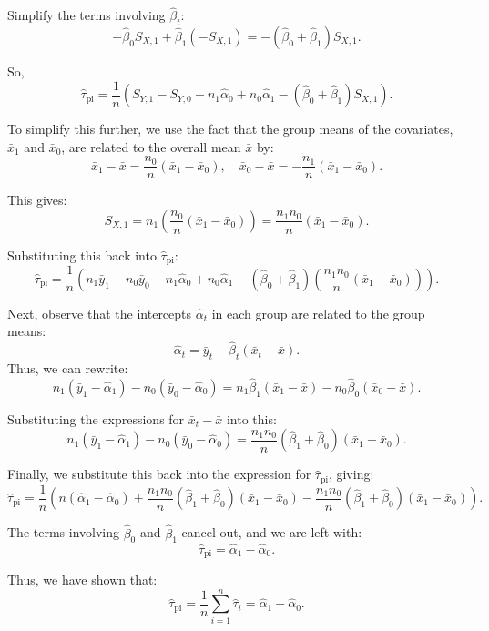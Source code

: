 \documentclass{article}
\begin{document}
Simplify the terms involving \(\hat{\beta}_t\):
\[
- \hat{\beta}_0 S_{X,1} + \hat{\beta}_1 (- S_{X,1}) = - (\hat{\beta}_0 + \hat{\beta}_1) S_{X,1}.
\]

So,
\[
\hat{\tau}_{\text{pi}} = \frac{1}{n} \left( S_{Y,1} - S_{Y,0} - n_1 \hat{\alpha}_0 + n_0 \hat{\alpha}_1 - (\hat{\beta}_0 + \hat{\beta}_1) S_{X,1} \right).
\]

To simplify this further, we use the fact that the group means of the covariates, \(\bar{x}_1\) and \(\bar{x}_0\), are related to the overall mean \(\bar{x}\) by:
\[
\bar{x}_1 - \bar{x} = \frac{n_0}{n} (\bar{x}_1 - \bar{x}_0), \quad \bar{x}_0 - \bar{x} = - \frac{n_1}{n} (\bar{x}_1 - \bar{x}_0).
\]

This gives:
\[
S_{X,1} = n_1 \left( \frac{n_0}{n} (\bar{x}_1 - \bar{x}_0) \right) = \frac{n_1 n_0}{n} (\bar{x}_1 - \bar{x}_0).
\]

Substituting this back into \(\hat{\tau}_{\text{pi}}\):
\[
\hat{\tau}_{\text{pi}} = \frac{1}{n} \left( n_1 \bar{y}_1 - n_0 \bar{y}_0 - n_1 \hat{\alpha}_0 + n_0 \hat{\alpha}_1 - (\hat{\beta}_0 + \hat{\beta}_1) \left( \frac{n_1 n_0}{n} (\bar{x}_1 - \bar{x}_0) \right) \right).
\]

Next, observe that the intercepts \(\hat{\alpha}_t\) in each group are related to the group means:
\[
\hat{\alpha}_t = \bar{y}_t - \hat{\beta}_t (\bar{x}_t - \bar{x}).
\]
Thus, we can rewrite:
\[
n_1 (\bar{y}_1 - \hat{\alpha}_1) - n_0 (\bar{y}_0 - \hat{\alpha}_0) = n_1 \hat{\beta}_1 (\bar{x}_1 - \bar{x}) - n_0 \hat{\beta}_0 (\bar{x}_0 - \bar{x}).
\]

Substituting the expressions for \(\bar{x}_t - \bar{x}\) into this:
\[
n_1 (\bar{y}_1 - \hat{\alpha}_1) - n_0 (\bar{y}_0 - \hat{\alpha}_0) = \frac{n_1 n_0}{n} (\hat{\beta}_1 + \hat{\beta}_0) (\bar{x}_1 - \bar{x}_0).
\]

Finally, we substitute this back into the expression for \(\hat{\tau}_{\text{pi}}\), giving:
\[
\hat{\tau}_{\text{pi}} = \frac{1}{n} \left( n (\hat{\alpha}_1 - \hat{\alpha}_0) + \frac{n_1 n_0}{n} (\hat{\beta}_1 + \hat{\beta}_0) (\bar{x}_1 - \bar{x}_0) - \frac{n_1 n_0}{n} (\hat{\beta}_1 + \hat{\beta}_0) (\bar{x}_1 - \bar{x}_0) \right).
\]

The terms involving \(\hat{\beta}_0\) and \(\hat{\beta}_1\) cancel out, and we are left with:
\[
\hat{\tau}_{\text{pi}} = \hat{\alpha}_1 - \hat{\alpha}_0.
\]

Thus, we have shown that:
\[
\hat{\tau}_{\text{pi}} = \frac{1}{n} \sum_{i=1}^{n} \hat{\tau}_i = \hat{\alpha}_1 - \hat{\alpha}_0.
\]
\end{document}
